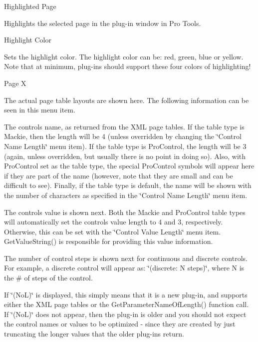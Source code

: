 \begin{DoxyItemize}
\item  Highlighted Page 

Highlights the selected page in the plug-\/in window in Pro Tools.


\item  Highlight Color 

Sets the highlight color. The highlight color can be\+: red, green, blue or yellow. Note that at minimum, plug-\/in\textquotesingle{}s should support these four colors of highlighting! 


\item  Page X 

The actual page table layouts are shown here. The following information can be seen in this menu item. 
\begin{DoxyItemize}
\item The control\textquotesingle{}s name, as returned from the X\+M\+L page tables. If the table type is Mackie, then the length will be 4 (unless overridden by changing the \char`\"{}\+Control Name Length\char`\"{} menu item). If the table type is Pro\+Control, the length will be 3 (again, unless overridden, but usually there is no point in doing so). Also, with Pro\+Control set as the table type, the special Pro\+Control symbols will appear here if they are part of the name (however, note that they are small and can be difficult to see). Finally, if the table type is default, the name will be shown with the number of characters as specified in the \char`\"{}\+Control Name Length\char`\"{} menu item.  
\item The control\textquotesingle{}s value is shown next. Both the Mackie and Pro\+Control table types will automatically set the control\textquotesingle{}s value length to 4 and 3, respectively. Otherwise, this can be set with the \char`\"{}\+Control Value Length\char`\"{} menu item. Get\+Value\+String() is responsible for providing this \textquotesingle{}value\textquotesingle{} information. 
\item The number of control steps is shown next for continuous and discrete controls. For example, a discrete control will appear as\+: \char`\"{}(discrete\+: N steps)\char`\"{}, where N is the \# of steps of the control. 
\item If \char`\"{}(\+No\+L)\char`\"{} is displayed, this simply means that it is a new plug-\/in, and supports either the X\+M\+L page tables or the Get\+Parameter\+Name\+Of\+Length() function call. If \char`\"{}(\+No\+L)\char`\"{} does not appear, then the plug-\/in is older and you should not expect the control names or values to be optimized -\/ since they are created by just truncating the longer values that the older plug-\/ins return. 

\end{DoxyItemize}
\end{DoxyItemize}
